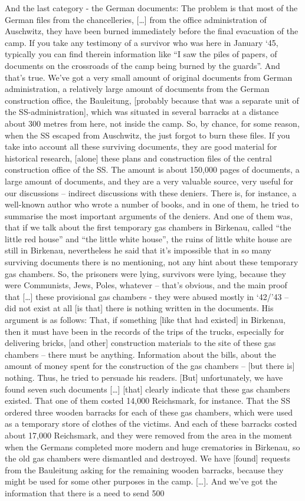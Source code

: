 And the last category - the German documents: The problem is that most of the German files from the chancelleries, […] from the office administration of Auschwitz, they have been burned immediately before the final evacuation of the camp. If you take any testimony of a survivor who was here in January ‘45, typically you can find therein information like “I saw the piles of papers, of documents on the crossroads of the camp being burned by the guards”. And that's true. We've got a very small amount of original documents from German administration, a relatively large amount of documents from the German construction office, the Bauleitung, [probably because that was a separate unit of the SS-administration], which was situated in several barracks at a distance about 300 metres from here, not inside the camp. So, by chance, for some reason, when the SS escaped from Auschwitz, the just forgot to burn these files. If you take into account all these surviving documents, they are good material for historical research, [alone] these plans and construction files of the central construction office of the SS. The amount is about 150,000 pages of documents, a large amount of documents, and they are a very valuable source, very useful for our discussions – indirect discussions with these deniers. There is, for instance, a well-known author who wrote a number of books, and in one of them, he tried to summarise the most important arguments of the deniers. And one of them was, that if we talk about the first temporary gas chambers in Birkenau, called “the little red house” and “the little white house”, the ruins of little white house are still in Birkenau, nevertheless he said that it’s impossible that in so many surviving documents there is no mentioning, not any hint about these temporary gas chambers. So, the prisoners were lying, survivors were lying, because they were Communists, Jews, Poles, whatever – that’s obvious, and the main proof that […] these provisional gas chambers - they were abused mostly in ‘42/’43 – did not exist at all [is that] there is nothing written in the documents. His argument is as follows: That, if something [like that had existed] in Birkenau, then it must have been in the records of the trips of the trucks, especially for delivering bricks, [and other] construction materials to the site of these gas chambers – there must be anything. Information about the bills, about the amount of money spent for the construction of the gas chambers – [but there is] nothing. Thus, he tried to persuade his readers. [But] unfortunately, we have found seven such documents […] [that] clearly indicate that these gas chambers existed. That one of them costed 14,000 Reichsmark, for instance. That the SS ordered three wooden barracks for each of these gas chambers, which were used as a temporary store of clothes of the victims. And each of these barracks costed about 17,000 Reichsmark, and they were removed from the area in the moment when the Germans completed more modern and huge crematories in Birkenau, so the old gas chambers were dismantled and destroyed. We have [found] requests from the Bauleitung asking for the remaining wooden barracks, because they might be used for some other purposes in the camp. […]. And we’ve got the information that there is a need to send 500 